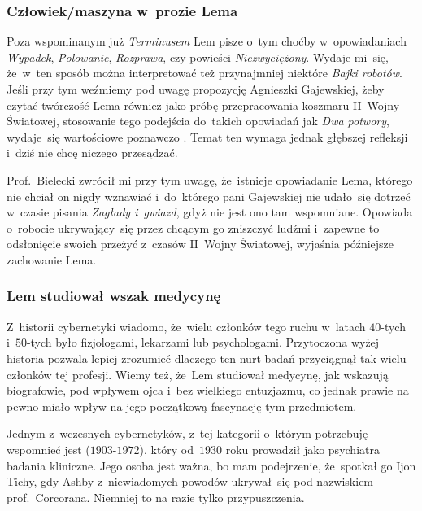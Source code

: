 \documentclass[10pt,t]{beamer}
\begin{document}
\begin{frame}
  \frametitle{Człowiek/maszyna w~prozie Lema}


  Poza wspominanym już \textit{Terminusem} Lem pisze o~tym choćby
  w~opowiadaniach \textit{Wypadek}, \textit{Polowanie}, \textit{Rozprawa},
  czy powieści \textit{Niezwyciężony}. Wydaje mi~się, że~w~ten sposób można
  interpretować też przynajmniej niektóre \textit{Bajki robotów}. Jeśli
  przy tym weźmiemy pod uwagę propozycję Agnieszki Gajewskiej, żeby czytać
  twórczość Lema również jako próbę przepracowania koszmaru II~Wojny
  Światowej, stosowanie tego podejścia do~takich opowiadań jak
  \textit{Dwa potwory}, wydaje~się wartościowe poznawczo
  \parencite{Gajewska-Zaglada-i-gwiazdy-Pub-2017}. Temat ten wymaga jednak
  głębszej refleksji i~dziś nie chcę niczego przesądzać.

  Prof.~Bielecki zwrócił mi przy tym uwagę, że~istnieje opowiadanie Lema,
  którego nie chciał on nigdy wznawiać i~do~którego pani Gajewskiej
  nie udało~się dotrzeć w~czasie pisania \textit{Zagłady i~gwiazd}, gdyż
  nie jest ono tam wspomniane. Opowiada o~robocie ukrywający~się przez
  chcącym go zniszczyć ludźmi i~zapewne to odsłonięcie swoich przeżyć
  z~czasów II~Wojny Światowej, wyjaśnia późniejsze zachowanie Lema.

\end{frame}





\begin{frame}
  \frametitle{Lem studiował wszak medycynę}


  Z~historii cybernetyki wiadomo, że~wielu członków tego ruchu w~latach
  $40$-tych i~$50$-tych było fizjologami, lekarzami lub psychologami.
  Przytoczona wyżej historia pozwala lepiej zrozumieć dlaczego ten nurt
  badań przyciągnął tak wielu członków tej profesji. Wiemy też, że~Lem
  studiował medycynę, jak wskazują biografowie, pod wpływem ojca i~bez
  wielkiego entuzjazmu, co jednak prawie na pewno miało wpływ na
  jego początkową fascynację tym przedmiotem.

  Jednym z~wczesnych cybernetyków, z~tej kategorii o~którym potrzebuję
  wspomnieć jest
   ($1903\text{-}1972$), który od~$1930$ roku prowadził
  jako psychiatra badania kliniczne. Jego osoba jest ważna, bo mam
  podejrzenie,
  że~spotkał go Ijon Tichy, gdy Ashby z~niewiadomych powodów ukrywał~się
  pod nazwiskiem prof.~Corcorana. Niemniej to na razie tylko przypuszczenia.

\end{frame}
\end{document}
